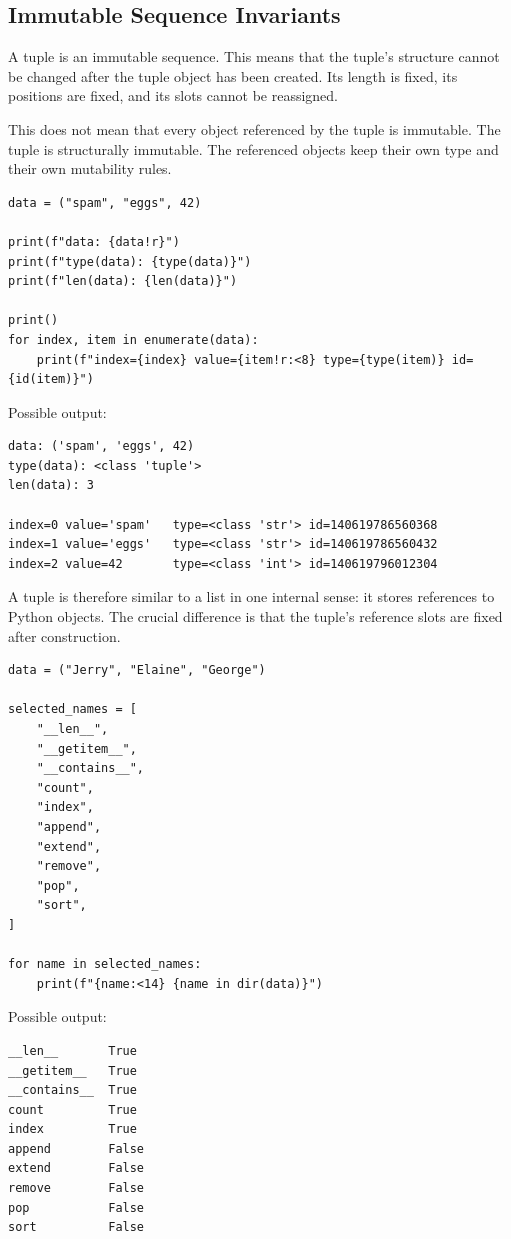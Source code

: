 \subsection{Immutable Sequence Invariants}

A tuple is an immutable sequence. This means that the tuple's structure cannot be changed after the tuple object has been created. Its length is fixed, its positions are fixed, and its slots cannot be reassigned.

This does not mean that every object referenced by the tuple is immutable. The tuple is structurally immutable. The referenced objects keep their own type and their own mutability rules.

\begin{verbatim}
data = ("spam", "eggs", 42)

print(f"data: {data!r}")
print(f"type(data): {type(data)}")
print(f"len(data): {len(data)}")

print()
for index, item in enumerate(data):
    print(f"index={index} value={item!r:<8} type={type(item)} id={id(item)}")
\end{verbatim}

Possible output:

\begin{verbatim}
data: ('spam', 'eggs', 42)
type(data): <class 'tuple'>
len(data): 3

index=0 value='spam'   type=<class 'str'> id=140619786560368
index=1 value='eggs'   type=<class 'str'> id=140619786560432
index=2 value=42       type=<class 'int'> id=140619796012304
\end{verbatim}

A tuple is therefore similar to a list in one internal sense: it stores references to Python objects. The crucial difference is that the tuple's reference slots are fixed after construction.

\begin{verbatim}
data = ("Jerry", "Elaine", "George")

selected_names = [
    "__len__",
    "__getitem__",
    "__contains__",
    "count",
    "index",
    "append",
    "extend",
    "remove",
    "pop",
    "sort",
]

for name in selected_names:
    print(f"{name:<14} {name in dir(data)}")
\end{verbatim}

Possible output:

\begin{verbatim}
__len__       True
__getitem__   True
__contains__  True
count         True
index         True
append        False
extend        False
remove        False
pop           False
sort          False
\end{verbatim}

